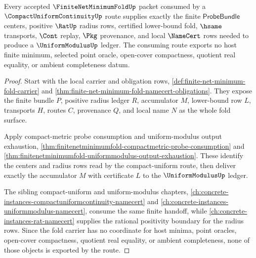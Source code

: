 \begin{theorem}
\label{thm:finite-net-minimum-fold-compact-uniform-modulus-consumption}
Every accepted $\FiniteNetMinimumFoldUp$ packet consumed by a $\CompactUniformContinuityUp$ route supplies exactly the finite $\mathsf{ProbeBundle}$ centers, positive $\RatUp$ radius rows, certified lower-bound fold, $\hsame$ transports, $\Cont$ replay, $\Pkg$ provenance, and local $\NameCert$ rows needed to produce a $\UniformModulusUp$ ledger. The consuming route exports no host finite minimum, selected point oracle, open-cover compactness, quotient real equality, or ambient completeness datum.
\end{theorem}
\begin{proof}
Start with the local carrier and obligation rows, \autoref{def:finite-net-minimum-fold-carrier} and \autoref{thm:finite-net-minimum-fold-namecert-obligations}. They expose the finite bundle $P$, positive radius ledger $R$, accumulator $M$, lower-bound row $L$, transports $H$, routes $C$, provenance $Q$, and local name $N$ as the whole fold surface.

Apply compact-metric probe consumption and uniform-modulus output exhaustion, \autoref{thm:finitenetminimumfold-compactmetric-probe-consumption} and \autoref{thm:finitenetminimumfold-uniformmodulus-output-exhaustion}. These identify the centers and radius rows read by the compact-uniform route, then deliver exactly the accumulator $M$ with certificate $L$ to the $\UniformModulusUp$ ledger.

The sibling compact-uniform and uniform-modulus chapters, \autoref{ch:concrete-instances-compactuniformcontinuity-namecert} and \autoref{ch:concrete-instances-uniformmodulus-namecert}, consume the same finite handoff, while \autoref{ch:concrete-instances-rat-namecert} supplies the rational positivity boundary for the radius rows. Since the fold carrier has no coordinate for host minima, point oracles, open-cover compactness, quotient real equality, or ambient completeness, none of those objects is exported by the route.
\end{proof}

